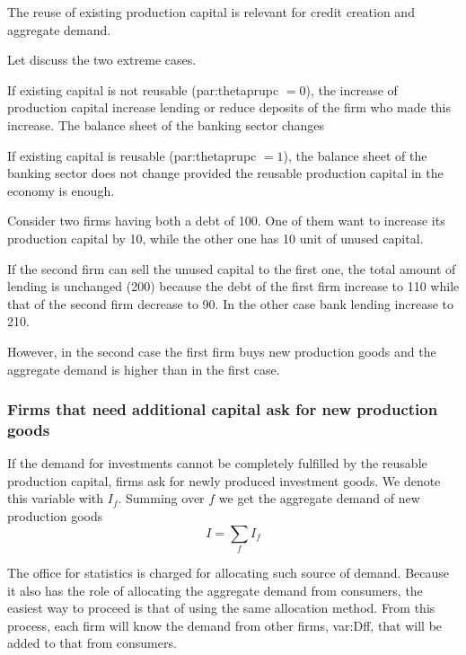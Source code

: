 \documentclass{book}
\begin{document}
The reuse of existing production capital is relevant for credit creation and aggregate demand.

Let discuss the two extreme cases.

If existing capital is not reusable (\gls{par:thetaprupc} $=0$), the increase of production capital increase lending or reduce deposits of the firm who made this increase. The balance sheet of the banking sector changes

If existing capital is reusable (\gls{par:thetaprupc} $=1$), the balance sheet of the banking sector does not change provided the reusable production capital in the economy is enough.

Consider two firms having both a debt of 100. One of them want to increase its production capital by 10, while the other one has 10 unit of unused capital. 

If the second firm can sell the unused capital to the first one, the total amount of lending is unchanged (200) because the debt of the first firm increase to 110 while that of the second firm decrease to 90.
In the other case bank lending increase to 210.

However, in the second case the first firm buys new production goods and the aggregate demand is higher than in the first case. 

\fi

\subsubsection{Firms that need additional capital ask for new production goods}

If the demand for investments cannot be completely fulfilled by the reusable production capital, firms ask for newly produced investment goods.
We denote this variable with $I_f$. 
Summing over $f$ we get the aggregate demand of new production goods
\[I=\sum_f I_f\]


The office for statistics is charged for allocating such source of demand. Because it also has the role of allocating the aggregate demand from consumers, the easiest way to proceed is that of
using the same allocation method. From this process, each firm will know the demand from other firms, \gls{var:Dff}, that will be added to that from consumers.

\end{document}
